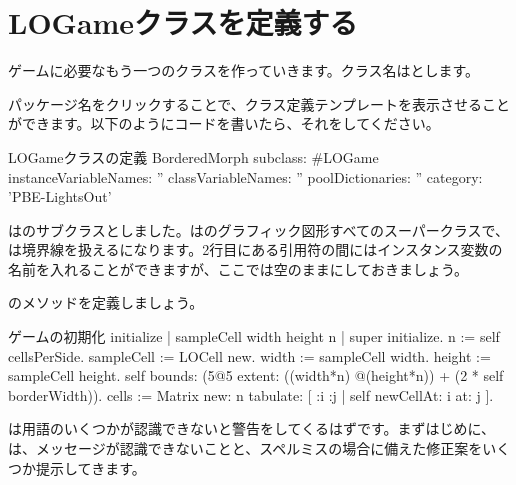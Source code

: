 \documentclass[a4paper,10pt,twoside]{book}
\begin{document}

\section{LOGameクラスを定義する}

ゲームに必要なもう一つのクラスを作っていきます。クラス名はとします。


パッケージ名をクリックすることで、クラス定義テンプレートを表示させることができます。以下のようにコードを書いたら、それをしてください。

\begin{classdef}[sbegame]{LOGameクラスの定義}
BorderedMorph subclass: #LOGame
   instanceVariableNames: ''
   classVariableNames: ''
   poolDictionaries: ''
   category: 'PBE-LightsOut'
\end{classdef}

はのサブクラスとしました。は\pharo のグラフィック図形すべてのスーパークラスで、は境界線を扱えるになります。2行目にある引用符の間にはインスタンス変数の名前を入れることができますが、ここでは空のままにしておきましょう。

のメソッドを定義しましょう。


\begin{numMethod}[sbegameinitialize]{ゲームの初期化}
initialize
   | sampleCell width height n |
   super initialize.
   n := self cellsPerSide.
   sampleCell := LOCell new.
   width := sampleCell width.
   height := sampleCell height.
   self bounds: (5@5 extent: ((width*n) @(height*n)) + (2 * self borderWidth)).
   cells := Matrix new: n tabulate: [ :i :j | self newCellAt: i at: j ].
\end{numMethod}


\pharo は用語のいくつかが認識できないと警告をしてくるはずです。まずはじめに、\pharo は、メッセージが認識できないことと、スペルミスの場合に備えた修正案をいくつか提示してきます。
\end{document}
